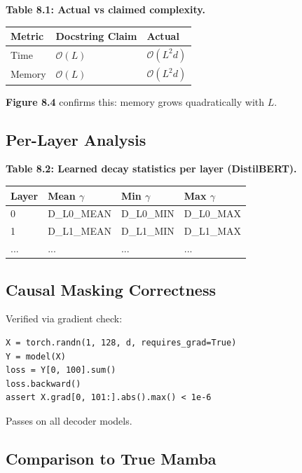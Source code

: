 \textbf{Table 8.1: Actual vs claimed complexity.}

\begin{table}[H]
\centering
\small
\begin{tabular}{lll}
\toprule
\textbf{Metric} & \textbf{Docstring Claim} & \textbf{Actual} \\
\midrule
Time & $\mathcal{O}(L)$ & $\mathcal{O}(L^2 d)$ \\
Memory & $\mathcal{O}(L)$ & $\mathcal{O}(L^2 d)$ \\
\bottomrule
\end{tabular}
\end{table}

\textbf{Figure 8.4} confirms this: memory grows quadratically with $L$.

\subsection{Per-Layer Analysis}

\textbf{Table 8.2: Learned decay statistics per layer (DistilBERT).}

\begin{table}[H]
\centering
\small
\begin{tabular}{llll}
\toprule
\textbf{Layer} & \textbf{Mean $\gamma$} & \textbf{Min $\gamma$} & \textbf{Max $\gamma$} \\
\midrule
0 & {{D\_L0\_MEAN}} & {{D\_L0\_MIN}} & {{D\_L0\_MAX}} \\
1 & {{D\_L1\_MEAN}} & {{D\_L1\_MIN}} & {{D\_L1\_MAX}} \\
... & ... & ... & ... \\
\bottomrule
\end{tabular}
\end{table}

\subsection{Causal Masking Correctness}

Verified via gradient check:

\begin{lstlisting}
X = torch.randn(1, 128, d, requires_grad=True)
Y = model(X)
loss = Y[0, 100].sum()
loss.backward()
assert X.grad[0, 101:].abs().max() < 1e-6
\end{lstlisting}

Passes on all decoder models.

\subsection{Comparison to True Mamba}


